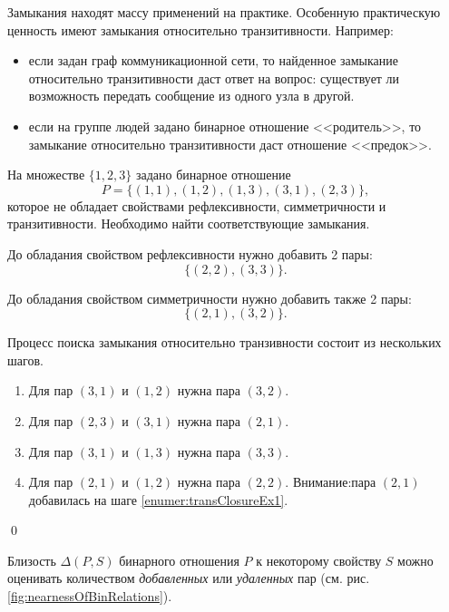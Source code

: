 Замыкания находят массу применений на практике. Особенную практическую ценность имеют замыкания относительно транзитивности. Например:
\begin{itemize}
    \item если задан граф коммуникационной сети, то найденное замыкание относительно транзитивности даст ответ на вопрос: существует ли возможность передать сообщение из одного узла в другой. 
    
    \item если на группе людей задано бинарное отношение <<родитель>>, то замыкание относительно транзитивности даст отношение <<предок>>.
\end{itemize}
    
\begin{exampl}
    На множестве $\{1,2,3\}$ задано бинарное отношение 
    \[P=\{(1,1),(1,2),(1,3),(3,1),(2,3)\},\]
    которое не обладает свойствами рефлексивности, симметричности и транзитивности. Необходимо найти соответствующие замыкания.
    
    До обладания свойством рефлексивности нужно добавить 2 пары: \[\{(2,2),(3,3)\}.\]
    
    До обладания свойством симметричности нужно добавить также 2 пары: \[\{(2,1),(3,2)\}.\]
    
    Процесс поиска замыкания относительно транзивности состоит из нескольких шагов.
    \begin{enumerate}
        \item Для пар $(3,1)$ и $(1,2)$ нужна пара $(3,2)$.
        \item Для пар $(2,3)$ и $(3,1)$ нужна пара $(2,1)$.\label{enumer:transClosureEx1}
        \item Для пар $(3,1)$ и $(1,3)$ нужна пара $(3,3)$.
        \item Для пар $(2,1)$ и $(1,2)$ нужна пара $(2,2)$. Внимание:пара $(2,1)$ добавилась на шаге \ref{enumer:transClosureEx1}.
    \end{enumerate}
    \qed
\end{exampl}

Близость $\Delta(P,S)$ бинарного отношения $P$ к некоторому свойству $S$ можно оценивать количеством \emph{добавленных} или \emph{удаленных} пар (см. рис. \ref{fig:nearnessOfBinRelations}).

